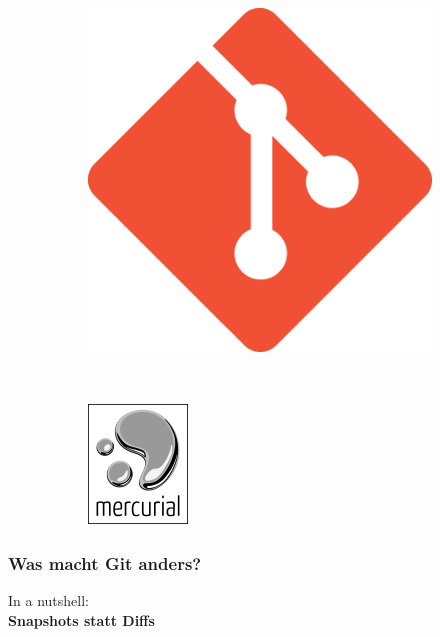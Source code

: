 \documentclass[12pt,utf8]{beamer}
\begin{document}
\begin{frame}
\begin{figure}
\begin{subfigure}[t]{0.3\textwidth}
				\includegraphics[width=\textwidth]{resources/git.png}
				\caption*{\tiny{\cite{git_logo}}}
			\end{subfigure}
			~
			\begin{subfigure}[t]{0.3\textwidth}
				\centering
				\includegraphics[scale=0.6]{resources/mercurial.png}
				\caption*{\tiny{\cite{mercurial}}}
			\end{subfigure}
		\end{figure}
	\end{frame}

	\begin{frame}
		\frametitle{Was macht Git anders?}
		\centering
		In a nutshell:\\
		\textbf{Snapshots statt Diffs}
	\end{frame}
\end{document}
